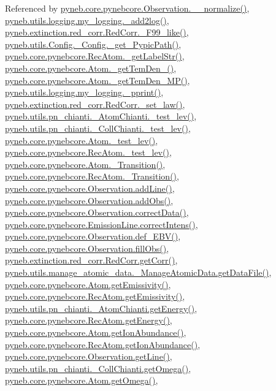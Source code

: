 Referenced by \hyperlink{pynebcore_8py_source_l03885}{pyneb.\+core.\+pynebcore.\+Observation.\+\_\+\+\_\+normalize()}, \hyperlink{logging_8py_source_l00059}{pyneb.\+utils.\+logging.\+my\+\_\+logging.\+\_\+add2log()}, \hyperlink{red__corr_8py_source_l00658}{pyneb.\+extinction.\+red\+\_\+corr.\+Red\+Corr.\+\_\+\+F99\+\_\+like()}, \hyperlink{_config_8py_source_l00086}{pyneb.\+utils.\+Config.\+\_\+\+Config.\+\_\+get\+\_\+\+Pypic\+Path()}, \hyperlink{pynebcore_8py_source_l02854}{pyneb.\+core.\+pynebcore.\+Rec\+Atom.\+\_\+get\+Label\+Str()}, \hyperlink{pynebcore_8py_source_l01803}{pyneb.\+core.\+pynebcore.\+Atom.\+\_\+get\+Tem\+Den\+\_()}, \hyperlink{pynebcore_8py_source_l01980}{pyneb.\+core.\+pynebcore.\+Atom.\+\_\+get\+Tem\+Den\+\_\+\+M\+P()}, \hyperlink{logging_8py_source_l00051}{pyneb.\+utils.\+logging.\+my\+\_\+logging.\+\_\+pprint()}, \hyperlink{red__corr_8py_source_l00176}{pyneb.\+extinction.\+red\+\_\+corr.\+Red\+Corr.\+\_\+set\+\_\+law()}, \hyperlink{pn__chianti_8py_source_l00284}{pyneb.\+utils.\+pn\+\_\+chianti.\+\_\+\+Atom\+Chianti.\+\_\+test\+\_\+lev()}, \hyperlink{pn__chianti_8py_source_l00449}{pyneb.\+utils.\+pn\+\_\+chianti.\+\_\+\+Coll\+Chianti.\+\_\+test\+\_\+lev()}, \hyperlink{pynebcore_8py_source_l01459}{pyneb.\+core.\+pynebcore.\+Atom.\+\_\+test\+\_\+lev()}, \hyperlink{pynebcore_8py_source_l02596}{pyneb.\+core.\+pynebcore.\+Rec\+Atom.\+\_\+test\+\_\+lev()}, \hyperlink{pynebcore_8py_source_l01367}{pyneb.\+core.\+pynebcore.\+Atom.\+\_\+\+Transition()}, \hyperlink{pynebcore_8py_source_l02696}{pyneb.\+core.\+pynebcore.\+Rec\+Atom.\+\_\+\+Transition()}, \hyperlink{pynebcore_8py_source_l03436}{pyneb.\+core.\+pynebcore.\+Observation.\+add\+Line()}, \hyperlink{pynebcore_8py_source_l03467}{pyneb.\+core.\+pynebcore.\+Observation.\+add\+Obs()}, \hyperlink{pynebcore_8py_source_l03906}{pyneb.\+core.\+pynebcore.\+Observation.\+correct\+Data()}, \hyperlink{pynebcore_8py_source_l03325}{pyneb.\+core.\+pynebcore.\+Emission\+Line.\+correct\+Intens()}, \hyperlink{pynebcore_8py_source_l03861}{pyneb.\+core.\+pynebcore.\+Observation.\+def\+\_\+\+E\+B\+V()}, \hyperlink{pynebcore_8py_source_l03452}{pyneb.\+core.\+pynebcore.\+Observation.\+fill\+Obs()}, \hyperlink{red__corr_8py_source_l00211}{pyneb.\+extinction.\+red\+\_\+corr.\+Red\+Corr.\+get\+Corr()}, \hyperlink{manage__atomic__data_8py_source_l00297}{pyneb.\+utils.\+manage\+\_\+atomic\+\_\+data.\+\_\+\+Manage\+Atomic\+Data.\+get\+Data\+File()}, \hyperlink{pynebcore_8py_source_l01716}{pyneb.\+core.\+pynebcore.\+Atom.\+get\+Emissivity()}, \hyperlink{pynebcore_8py_source_l02873}{pyneb.\+core.\+pynebcore.\+Rec\+Atom.\+get\+Emissivity()}, \hyperlink{pn__chianti_8py_source_l00346}{pyneb.\+utils.\+pn\+\_\+chianti.\+\_\+\+Atom\+Chianti.\+get\+Energy()}, \hyperlink{pynebcore_8py_source_l02811}{pyneb.\+core.\+pynebcore.\+Rec\+Atom.\+get\+Energy()}, \hyperlink{pynebcore_8py_source_l02110}{pyneb.\+core.\+pynebcore.\+Atom.\+get\+Ion\+Abundance()}, \hyperlink{pynebcore_8py_source_l02961}{pyneb.\+core.\+pynebcore.\+Rec\+Atom.\+get\+Ion\+Abundance()}, \hyperlink{pynebcore_8py_source_l03543}{pyneb.\+core.\+pynebcore.\+Observation.\+get\+Line()}, \hyperlink{pn__chianti_8py_source_l00484}{pyneb.\+utils.\+pn\+\_\+chianti.\+\_\+\+Coll\+Chianti.\+get\+Omega()}, \hyperlink{pynebcore_8py_source_l01262}{pyneb.\+core.\+pynebcore.\+Atom.\+get\+Omega()}, 